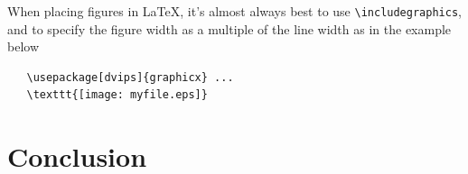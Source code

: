 \documentclass[rebuttal]{cvpr}
\begin{document}
When placing figures in \LaTeX, it's almost always best to use \verb+\includegraphics+, and to specify the  figure width as a multiple of the line width as in the example below



{\small\begin{verbatim}
   \usepackage[dvips]{graphicx} ...
   \texttt{[image: myfile.eps]}
\end{verbatim}
}

\section{Conclusion}

\nocite{*}

{\small
}
\end{document}
